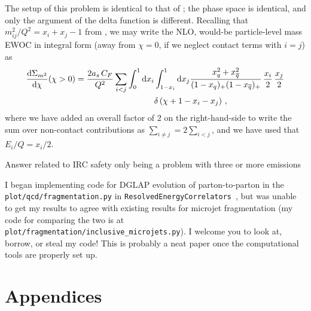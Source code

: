 
The setup of this problem is identical to that of ;
%
the phase space is identical, and only the argument of the delta function is different.
%
Recalling that \(m^2_{ij} / Q^2 = x_i + x_j - 1\) from , we may write the NLO, would-be particle-level mass EWOC in integral form (away from \(\chi = 0\), if we neglect contact terms with \(i=j\)) as
\begin{align}
    \label{eq:ee2hadrons_EEC}
    \frac{\dd\Sigma_{m^2}}{\dd\chi}
    (\chi>0)
    =
    \frac{2\ascf}{Q^2}
    \sum_{i<j}
    \int_0^1 \dd x_i
    &
    \int_{1-x_i}^1 \dd x_j
    \frac{x_q^2 + x_{\overline{q}}^2}{(1-x_q)_+(1-x_{\overline{q}})_+}
    \,\frac{x_i}{2}
    \,\frac{x_j}{2}
    \\
    &
    \notag
    \delta\le(
        \chi +
        1 - x_i - x_j
    \ri)
    \,,
\end{align}
where we have added an overall factor of \(2\) on the right-hand-side to write the sum over non-contact contributions as \(\sum_{i \neq j} = 2 \sum_{i < j}\), and we have used that \(E_i/Q = x_i / 2\).


    Answer related to IRC safety only being a problem with three or more emissions



I began implementing code for DGLAP evolution of \gls{parton-to-parton} in the \texttt{plot/qcd/fragmentation.py} in \texttt{ResolvedEnergyCorrelators}~\cite{github:RENC}, but was unable to get my results to agree with existing results for microjet fragmentation \cite{Dasgupta:2014yra,Dasgupta:2016bnd} (my code for comparing the two is at \texttt{plot/fragmentation/inclusive\_microjets.py}).
%
I welcome you to look at, borrow, or steal my code!
%
This is probably a neat paper once the computational tools are properly set up.





\iffalse
\section*{Appendices}


